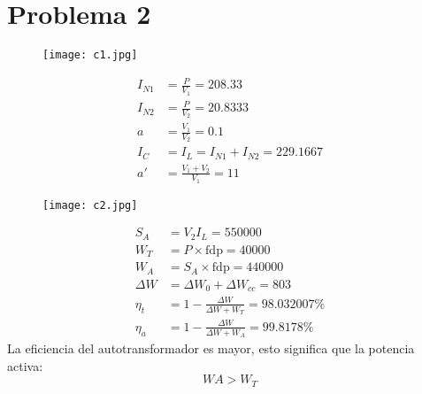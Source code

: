 \documentclass[a4paper,11pt]{article}
\newcommand{\mrm}{\mathrm}
\begin{document}
\section*{Problema 2}
\begin{figure}[H]
    \centering
    \texttt{[image: c1.jpg]}
\end{figure}
\begin{align*}
I_{N1} &= \frac{P}{V_{1}} = 208.33\\
I_{N2} &= \frac{P}{V_{2}} = 20.8333\\
a &= \frac{V_{1}}{V_{2}} = 0.1\\
I_{C} &= I_{L} = I_{N1}+I_{N2} = 229.1667\\
a' &= \frac{V_{1}+V_{2}}{V_{1}} = 11
\end{align*}
\begin{figure}[H]
    \centering
    \texttt{[image: c2.jpg]}
\end{figure}
\begin{align*}
    S_{A} &= V_{2}I_{L} = 550000\\
    W_{T} &= P\times \mrm{fdp} = 40000\\
    W_{A} &= S_{A}\times \mrm{fdp} = 440000\\
    \Delta W &= \Delta W_{0} + \Delta W_{cc} = 803\\
    \eta_{t} &= 1-\frac{\Delta W}{\Delta W + W_{T}} = 98.032007\%\\
    \eta_{a} &= 1-\frac{\Delta W}{\Delta W + W_{A}} = 99.8178\%
\end{align*}
La eficiencia del autotransformador es mayor, esto significa que la potencia activa:
$$
W{A} > W_{T}
$$
\end{document}
